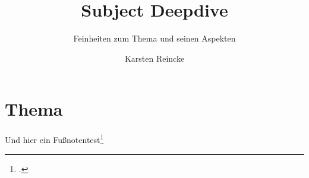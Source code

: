 \documentclass[
  DIV=calc,
  BCOR=5mm,
  11pt,
  headings=small,
  oneside,
  abstract=true,
  toc=bib,
  english,ngerman]{scrartcl}
\def\bibGl{../../../bib.gl}
\def\cfgGl{../../../cfg.gl/}
\def\cfgLf{../../cfg.lf}
\begin{document}

\nocite{*}

\titlehead{Ausbildung zur Fachinformatikerin}
\subject{Release }
\title{Subject Deepdive}

\subtitle{Feinheiten zum Thema und seinen Aspekten}
\author{Karsten Reincke}

\maketitle

\section{Thema}




Und hier ein Fußnotentest\footcite[vgl.][17]{RlpIt2019a}



\printbibliography


\printnomenclature
\end{document}
